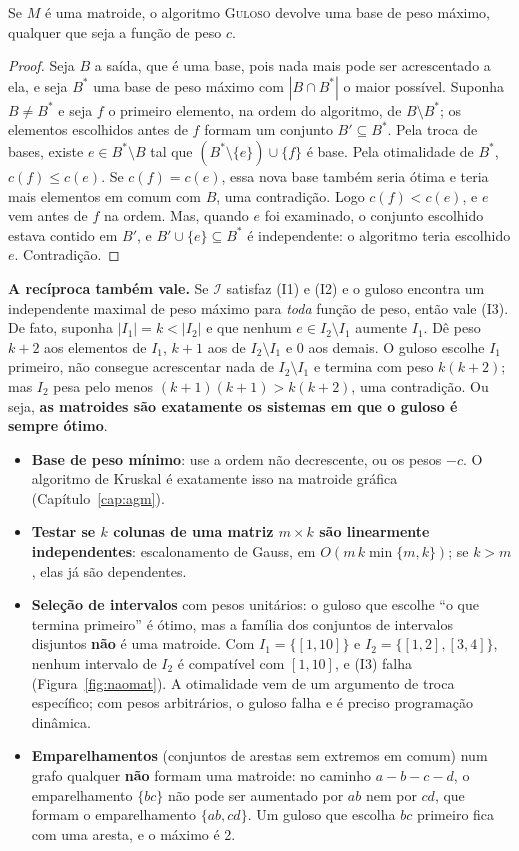 \begin{teo}\label{teo:gulosomat}
Se $M$ é uma matroide, o algoritmo \textup{\textsc{Guloso}} devolve uma base de peso máximo, qualquer que seja a função de peso $c$.
\end{teo}
\begin{proof}
Seja $B$ a saída, que é uma base, pois nada mais pode ser acrescentado a ela, e seja $B^*$ uma base de peso máximo com $|B\cap B^*|$ o maior possível. Suponha $B\ne B^*$ e seja $f$ o primeiro elemento, na ordem do algoritmo, de $B\setminus B^*$; os elementos escolhidos antes de $f$ formam um conjunto $B'\subseteq B^*$. Pela troca de bases, existe $e\in B^*\setminus B$ tal que $(B^*\setminus\{e\})\cup\{f\}$ é base. Pela otimalidade de $B^*$, $c(f)\le c(e)$. Se $c(f)=c(e)$, essa nova base também seria ótima e teria mais elementos em comum com $B$, uma contradição. Logo $c(f)<c(e)$, e $e$ vem antes de $f$ na ordem. Mas, quando $e$ foi examinado, o conjunto escolhido estava contido em $B'$, e $B'\cup\{e\}\subseteq B^*$ é independente: o algoritmo teria escolhido $e$. Contradição.
\end{proof}

\textbf{A recíproca também vale.} Se $\mathcal I$ satisfaz (I1) e (I2) e o guloso encontra um independente maximal de peso máximo para \emph{toda} função de peso, então vale (I3). De fato, suponha $|I_1|=k<|I_2|$ e que nenhum $e\in I_2\setminus I_1$ aumente $I_1$. Dê peso $k+2$ aos elementos de $I_1$, $k+1$ aos de $I_2\setminus I_1$ e 0 aos demais. O guloso escolhe $I_1$ primeiro, não consegue acrescentar nada de $I_2\setminus I_1$ e termina com peso $k(k+2)$; mas $I_2$ pesa pelo menos $(k+1)(k+1)>k(k+2)$, uma contradição. Ou seja, \textbf{as matroides são exatamente os sistemas em que o guloso é sempre ótimo}.
\begin{itemize}
  \item \textbf{Base de peso mínimo}: use a ordem não decrescente, ou os pesos $-c$. O algoritmo de Kruskal é exatamente isso na matroide gráfica (Capítulo~\ref{cap:agm}).
  \item \textbf{Testar se $k$ colunas de uma matriz $m\times k$ são linearmente independentes}: escalonamento de Gauss, em $O(m\,k\min\{m,k\})$; se $k>m$, elas já são dependentes.
  \item \textbf{Seleção de intervalos} com pesos unitários: o guloso que escolhe ``o que termina primeiro'' é ótimo, mas a família dos conjuntos de intervalos disjuntos \textbf{não} é uma matroide. Com $I_1=\{[1,10]\}$ e $I_2=\{[1,2],[3,4]\}$, nenhum intervalo de $I_2$ é compatível com $[1,10]$, e (I3) falha (Figura~\ref{fig:naomat}). A otimalidade vem de um argumento de troca específico; com pesos arbitrários, o guloso falha e é preciso programação dinâmica.
  \item \textbf{Emparelhamentos} (conjuntos de arestas sem extremos em comum) num grafo qualquer \textbf{não} formam uma matroide: no caminho $a\!-\!b\!-\!c\!-\!d$, o emparelhamento $\{bc\}$ não pode ser aumentado por $ab$ nem por $cd$, que formam o emparelhamento $\{ab,cd\}$. Um guloso que escolha $bc$ primeiro fica com uma aresta, e o máximo é 2.
\end{itemize}

